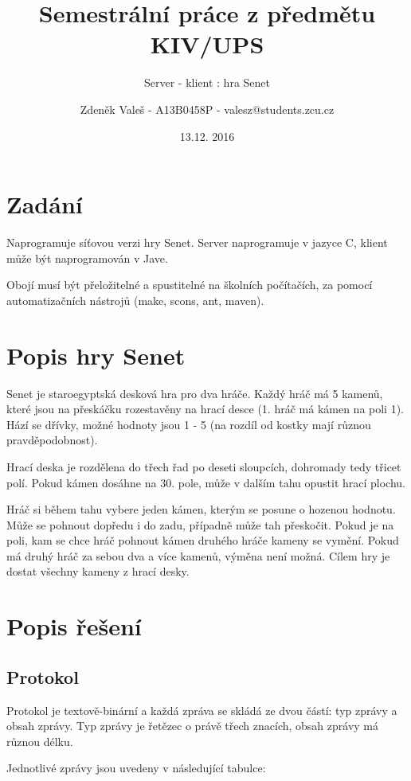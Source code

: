 \documentclass[11pt,a4paper]{scrartcl}
\begin{document}
	\title{Semestrální práce z předmětu KIV/UPS}
	\subtitle{Server - klient : hra Senet}
	\author{Zdeněk Valeš - A13B0458P - valesz@students.zcu.cz}
	\date{13.12. 2016}
	\maketitle
	\newpage
	
	\section{Zadání}
	Naprogramuje síťovou verzi hry Senet. Server naprogramuje v jazyce C, klient může být naprogramován v Jave.
	
	Obojí musí být přeložitelné a spustitelné na školních počítačích, za pomocí automatizačních nástrojů (make, scons, ant, maven).
	
	\section{Popis hry Senet}
	Senet je staroegyptská desková hra pro dva hráče. Každý hráč má 5 kamenů, které jsou na přeskáčku rozestavěny na hrací desce (1. hráč má kámen na poli 1). Hází se dřívky, možné hodnoty jsou 1 - 5 (na rozdíl od kostky mají různou pravděpodobnost). 
	
	Hrací deska je rozdělena do třech řad po deseti sloupcích, dohromady tedy třicet polí. Pokud kámen dosáhne na 30. pole, může v dalším tahu opustit hrací plochu.
	
	Hráč si během tahu vybere jeden kámen, kterým se posune o hozenou hodnotu. Může se pohnout dopředu i do zadu, případně může tah přeskočit. Pokud je na poli, kam se chce hráč pohnout kámen druhého hráče kameny se vymění. Pokud má druhý hráč za sebou dva a více kamenů, výměna není možná. Cílem hry je dostat všechny kameny z hrací desky.
	
	\section{Popis řešení}
	
	\subsection{Protokol}
	Protokol je textově-binární a každá zpráva se skládá ze dvou částí: typ zprávy a obsah zprávy. Typ zprávy je řetězec o právě třech znacích, obsah zprávy má různou délku.
	
	Jednotlivé zprávy jsou uvedeny v následující tabulce:
	
\end{document}
